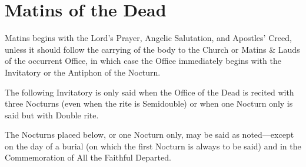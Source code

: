 \section{Matins of the Dead}
\begin{secrubric}
Matins begins with the Lord's Prayer, Angelic Salutation, and Apostles' Creed, unless it should follow the carrying of the body to the Church or Matins \& Lauds of the occurrent Office, in which case the Office immediately begins with the Invitatory or the Antiphon of the Nocturn.
\end{secrubric}
\begin{secrubric}
    The following Invitatory is only said when the Office of the Dead is recited with three Nocturns (even when the rite is Semidouble) or when one Nocturn only is said but with Double rite.
\end{secrubric}
\begin{secrubric}
    The Nocturns placed below, or one Nocturn only, may be said as noted---except on the day of a burial (on which the first Nocturn is always to be said) and in the Commemoration of All the Faithful Departed.%
\end{secrubric}
